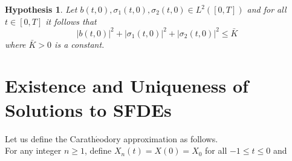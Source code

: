 \documentclass[a4 paper, 12pt]{report}
\theoremstyle{plain}
\newtheorem{hypothesis}[theorem]{\textbf{Hypothesis}}
\begin{document}
\begin{hypothesis}\label{hypo2}
Let $b(t,0),\sigma_1(t,0), \sigma_2(t,0)\in L^2([0,T])$ and for all $t\in[0,T]$ it follows that
$$
|b(t,0)|^2+|\sigma_1(t,0)|^2+|\sigma_2(t,0)|^2\leq \bar{K}
$$
where $\bar{K}>0$ is a constant.
\end{hypothesis}

\section{Existence and Uniqueness of Solutions to SFDEs}
\noindent
\par Let us define the Carath$\acute{\mbox{e}}$odory approximation as follows.\\
For any integer $n\geq 1$, define $X_n(t) = X(0) = X_0$ for all $-1\leq t\leq 0$ and 
\end{document}
